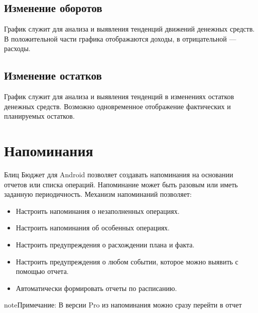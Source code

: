 \documentclass[a4paper,10pt,russian]{sphinxmanual}
\begin{document}
\section{Изменение оборотов}
\label{\detokenize{reports:id10}}
\sphinxAtStartPar
График служит для анализа и выявления тенденций движений денежных средств. В положительной части графика отображаются доходы,
в отрицательной — расходы.


\section{Изменение остатков}
\label{\detokenize{reports:id11}}
\sphinxAtStartPar
График служит для анализа и выявления тенденций в изменениях остатков денежных средств. Возможно одновременное отображение
фактических и планируемых остатков.

\noindent{}

\sphinxstepscope


\chapter{Напоминания}
\label{\detokenize{reminders:chapter-reminders}}\label{\detokenize{reminders:id1}}\label{\detokenize{reminders::doc}}
\sphinxAtStartPar
Блиц Бюджет для Android позволяет создавать напоминания на основании отчетов или списка операций. Напоминание может быть разовым
или иметь заданную периодичность. Механизм напоминаний позволяет:
\begin{itemize}
\item {} 
\sphinxAtStartPar
Настроить напоминания о незаполненных операциях.

\item {} 
\sphinxAtStartPar
Настроить напоминания об особенных операциях.

\item {} 
\sphinxAtStartPar
Настроить предупреждения о расхождении плана и факта.

\item {} 
\sphinxAtStartPar
Настроить предупреждения о любом событии, которое можно выявить с помощью отчета.

\item {} 
\sphinxAtStartPar
Автоматически формировать отчеты по расписанию.

\end{itemize}

\begin{sphinxadmonition}{note}{Примечание:}
\sphinxAtStartPar
В версии Pro из напоминания можно сразу перейти в отчет
\end{sphinxadmonition}
\end{document}
